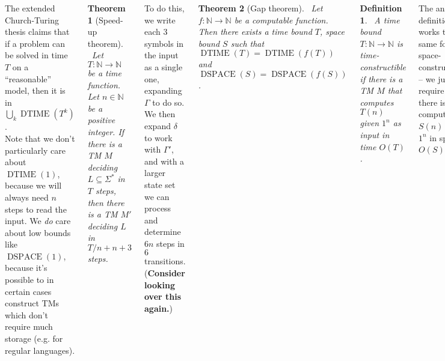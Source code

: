 \documentclass{tikzposter} %
\DeclareMathOperator{\dtime}{DTIME}
\DeclareMathOperator{\dspace}{DSPACE}
\newtheorem{theorem}{Theorem}
\newtheorem{definition}{Definition}
\begin{document}
\begin{columns}
{  The extended Church-Turing thesis claims that if a problem can be solved in time $T$ on a ``reasonable'' model, then it is in $\bigcup _{k} \dtime(T^{k})$. \\

  Note that we don't particularly care about $\dtime(1)$, because we will always need $n$ steps to read the input. We \emph{do} care about low bounds like $\dspace(1)$, because it's possible to in certain cases construct TMs which don't require much storage (e.g. for regular languages). \\

  \begin{theorem}[Speed-up theorem]
  \ Let $T : \mathbb{N} \to \mathbb{N}$ be a time function. Let $n \in \mathbb{N}$ be a positive integer. If there is a TM $M$ deciding $L \subseteq \Sigma^{*}$ in $T$ steps, then there is a TM $M'$ deciding $L$ in $T/n + n + 3$ steps.
  \end{theorem}
  \hphantom{}

  To do this, we write each 3 symbols in the input as a single one, expanding $\Gamma$ to do so. We then expand $\delta$ to work with $\Gamma'$, and with a larger state set we can process and determine $6n$ steps in $6$ transitions. (\textbf{Consider looking over this again.}) \\

  \begin{theorem}[Gap theorem]
  \ Let $f : \mathbb{N} \to \mathbb{N}$ be a computable function. Then there exists a time bound $T$, space bound $S$ such that $\dtime(T) = \dtime(f(T))$ and $\dspace(S) = \dspace(f(S))$.
  \end{theorem}
  \hphantom{}

  \begin{definition}
  \ A time bound $T : \mathbb{N} \to \mathbb{N}$ is time-constructible if there is a TM $M$ that computes $T(n)$ given $1^{n}$ as input in time $O(T)$.
  \end{definition}
  \hphantom{}

  The analogous definition works the same for space-constructibility -- we just require that there is a TM computing $S(n)$ from $1^{n}$ in space $O(S)$. \\

  \begin{theorem}[Time hierarchy]
  \ Let $T, T' : \mathbb{N} \to \mathbb{N}$ such that $T'$ is time-constructible and $T \log T = o(T')$. Then $\dtime(T) \subset \dtime(T')$.
  \end{theorem}
  \hphantom{}

}
\end{columns}
\end{document}
